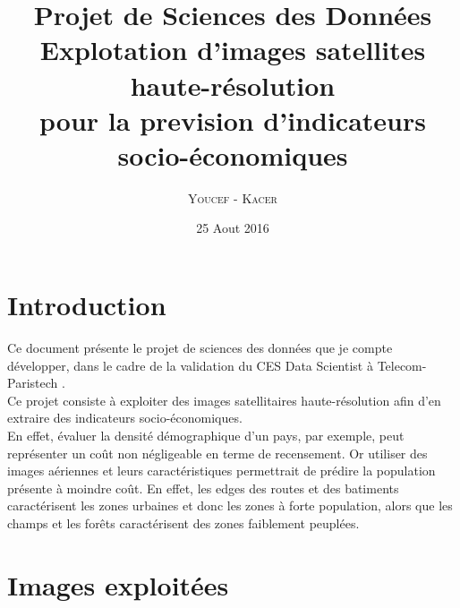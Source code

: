 \documentclass{book}
\title{%
  Projet de Sciences des Données \\
  \large Explotation d'images satellites haute-résolution \\pour la prevision d'indicateurs socio-économiques \\
    }
\author{\textsc{Youcef} - \textsc{Kacer}}
\date{25 Aout 2016}
\begin{document}
 
\maketitle

\tableofcontents

\frontmatter
\chapter{Introduction}
Ce document présente le projet de sciences des données que je compte développer, dans le cadre de la validation du CES Data Scientist à Telecom-Paristech \cite{cesds}.\\
Ce projet consiste à exploiter des images satellitaires haute-résolution afin d'en extraire des indicateurs socio-économiques.\\
En effet, évaluer la densité démographique d'un pays, par exemple, peut représenter un co\^{u}t non négligeable en terme de 
recensement. Or utiliser des images aériennes et leurs caractéristiques permettrait de prédire la population présente à moindre co\^{u}t.
En effet, les \og edges \fg des routes et des batiments caractérisent les zones urbaines et donc les zones à forte population, alors que
les champs et les for\^{e}ts caractérisent des zones faiblement peuplées.\\

\mainmatter
\chapter{Images exploitées}
\end{document}
